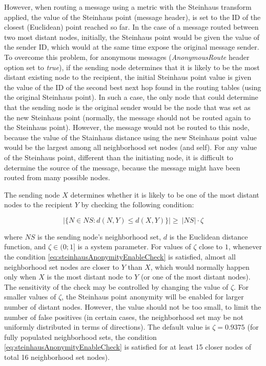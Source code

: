 However, when routing a message using a metric with the Steinhaus transform applied, the value of the Steinhaus point (message header), is set to the ID of the closest (Euclidean) point reached so far. In the case of a message routed between two most distant nodes, initially, the Steinhaus point would be given the value of the sender ID, which would at the same time expose the original message sender. To overcome this problem, for anonymous messages (\emph{AnonymousRoute} header option set to \emph{true}), if the sending node determines that it is likely to be the most distant existing node to the recipient, the initial Steinhaus point value is given the value of the ID of the second best next hop found in the routing tables (using the original Steinhaus point). In such a case, the only node that could determine that the sending node is the original sender would be the node that was set as the new Steinhaus point (normally, the message should not be routed again to the Steinhaus point). However, the message would not be routed to this node, because the value of the Stainhaus distance using the new Steinhaus point value would be the largest among all neighborhood set nodes (and self). For any value of the Steinhaus point, different than the initiating node, it is difficult to determine the source of the message, because the message might have been routed from many possible nodes.

The sending node $X$ determines whether it is likely to be one of the most distant nodes to the recipient $Y$ by checking the following condition:

\begin{equation} \label{eq:steinhausAnonymityEnableCheck}
	\left|\{N \in NS : d(N, Y) \leq d(X,Y)\} \right| \geq \ |NS| \cdot \zeta
\end{equation}

\noindent
where $NS$ is the sending node's neighborhood set, $d$ is the Euclidean distance function, and $\zeta \in (0; 1]$ is a system parameter. For values of $\zeta$ close to $1$, whenever the condition \ref{eq:steinhausAnonymityEnableCheck} is satisfied, almost all neighborhood set nodes are closer to $Y$ than $X$, which would normally happen only when $X$ is the most distant node to $Y$ (or one of the most distant nodes). The sensitivity of the check may be controlled by changing the value of $\zeta$. For smaller values of $\zeta$, the Steinhaus point anonymity will be enabled for larger number of distant nodes. However, the value should not be too small, to limit the number of false positives (in certain cases, the neighborhood set may be not uniformly distributed in terms of directions). The default value is $\zeta = 0.9375$ (for fully populated neighborhood sets, the condition \ref{eq:steinhausAnonymityEnableCheck} is satisfied for at least 15 closer nodes of total 16 neighborhood set nodes).

